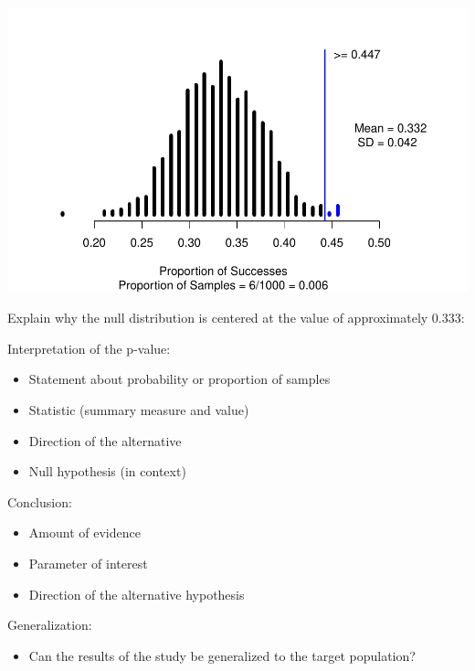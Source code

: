 \documentclass[
]{report}
\providecommand{\tightlist}{%
  \setlength{\itemsep}{0pt}\setlength{\parskip}{0pt}}
\begin{document}
\begin{center}\includegraphics[width=0.7\linewidth]{06-LN06-1cat_simulation_files/figure-latex/unnamed-chunk-2-1} \end{center}

Explain why the null distribution is centered at the value of approximately 0.333:

\vspace{0.5in}

Interpretation of the p-value:

\begin{itemize}
\item
  Statement about probability or proportion of samples
\item
  Statistic (summary measure and value)
\item
  Direction of the alternative
\item
  Null hypothesis (in context)
\end{itemize}

\vspace{0.8in}

\newpage

Conclusion:

\begin{itemize}
\item
  Amount of evidence
\item
  Parameter of interest
\item
  Direction of the alternative hypothesis
\end{itemize}

\vspace{0.6in}

Generalization:

\begin{itemize}
\tightlist
\item
  Can the results of the study be generalized to the target population?
\end{itemize}
\end{document}
